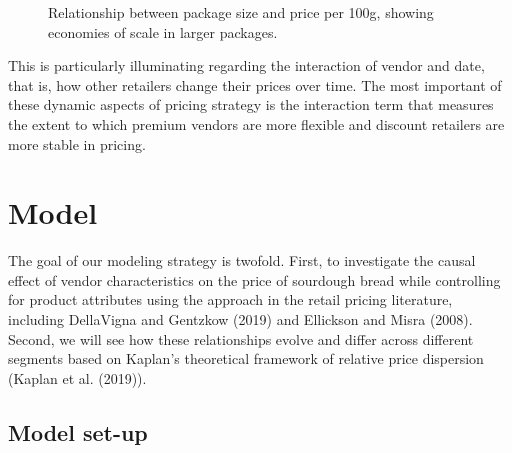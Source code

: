 \documentclass[
  letterpaper,
  DIV=11,
  numbers=noendperiod]{scrartcl}
\begin{document}
\begin{figure}


\caption{\label{fig-grams-vs-price}Relationship between package size and
price per 100g, showing economies of scale in larger packages.}

\end{figure}%

This is particularly illuminating regarding the interaction of vendor
and date, that is, how other retailers change their prices over time.
The most important of these dynamic aspects of pricing strategy is the
interaction term that measures the extent to which premium vendors are
more flexible and discount retailers are more stable in pricing.

\section{Model}\label{sec-model}

The goal of our modeling strategy is twofold. First, to investigate the
causal effect of vendor characteristics on the price of sourdough bread
while controlling for product attributes using the approach in the
retail pricing literature, including DellaVigna and Gentzkow (2019) and
Ellickson and Misra (2008). Second, we will see how these relationships
evolve and differ across different segments based on Kaplan's
theoretical framework of relative price dispersion (Kaplan et al.
(2019)).

\subsection{Model set-up}\label{model-set-up}
\end{document}
